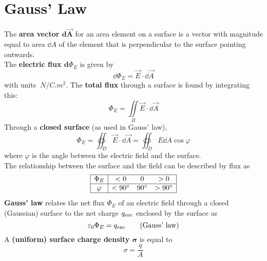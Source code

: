 \documentclass[./Electricity and Magnetism.tex]{subfiles}
\begin{document}
	\section{Gauss' Law}
		The \textbf{area vector \(\bm{\text{d}{\vec{A}}}\)} for an area element on a surface is a vector with magnitude equal to area \(\dd{A}\) of the element that is perpendicular to the surface pointing outwards. \\
		The \textbf{electric flux \({\bm{\text{d}}{\Phi_E}}\)} is given by
			\[\dd{\Phi_E} = \vec{E} \cdot \dd{\vec{A}} \tag{electric flux}\]
			with units \(\SI{}{N/C.m^2}\).
			The \textbf{total flux} through a surface is found by integrating this:
				\[\Phi_E = \iint\limits_R \vec{E} \cdot \dd{\vec{A}} \tag{total flux}\]
			Through a \textbf{closed surface} (as used in Gauss' law),
				\[\Phi_E = \oiint_D \vec{E} \cdot \dd{\vec{A}} = \oiint_D E\dd{A}\cos\varphi \tag{net flux}\]
				where \(\varphi\) is the angle between the electric field and the surface. \\
			The relationship between the surface and the field can be described by flux as
			\[
				\begin{array}{|c|ccc|}\hline
					\Phi_E & < 0 & 0 & > 0 \\\hline
					\varphi & < 90^\circ & 90^\circ & > 90^\circ \\\hline
				\end{array}
			\]
		\textbf{Gauss' law} relates the net flux \(\Phi_E\) of an electric field through a closed (Gaussian) surface to the net charge \(q_{\text{enc}}\) enclosed by the surface as
			\[\varepsilon_0\Phi_E = q_{\text{enc}} \tag{Gauss' law}\]
		A \textbf{(uniform) surface charge density \(\bm{\sigma}\)} is equal to
			\[\sigma = \frac{q}{A}\]
\end{document}

